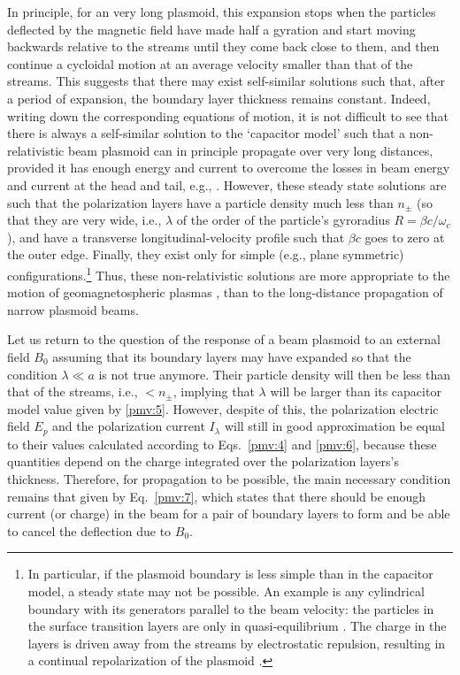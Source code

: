 \documentclass [12pt,a4paper,     ]{report} %
\begin{document}
  In principle, for an very long plasmoid, this expansion stops when the particles deflected by the magnetic field have made half a gyration and start moving backwards relative to the streams until they come back close to them, and then continue a cycloidal motion at an average velocity smaller than that of the streams.  This suggests that there may exist self-similar solutions such that, after a period of expansion, the boundary layer thickness remains constant.  Indeed, writing down the corresponding equations of motion, it is not difficult to see that there is always a self-similar solution to the `capacitor model' such that a non-relativistic beam plasmoid can in principle propagate over very long distances, provided it has enough energy and current to overcome the losses in beam energy and current at the head and tail, e.g., \cite{BOROV1987-}.  However, these steady state solutions are such that the polarization layers have a particle density much less than $n_\pm$ (so that they are very wide, i.e., $\lambda$ of the order of the particle's gyroradius $R=\beta c /\omega_c$), and have a transverse longitudinal-velocity profile such that $\beta c$ goes to zero at the outer edge. Finally, they exist only for simple (e.g., plane symmetric) configurations.\footnote{In particular, if the plasmoid boundary is less simple than in the capacitor model, a steady state may not be possible.  An example is any cylindrical boundary with its generators parallel to the beam velocity: the particles in the surface transition layers are only in quasi-equilibrium \cite{CHAPM1960-}. The charge in the layers is driven away from the streams by electrostatic repulsion, resulting in a continual repolarization of the plasmoid \cite{GALVE1991-}.} Thus, these non-relativistic solutions are more appropriate to the motion of geomagnetospheric plasmas \cite{CHAPM1960-}, than to the long-distance propagation of narrow plasmoid beams. 

   Let us return to the question of the response of a beam plasmoid to an external field $B_0$ assuming that its boundary layers may have expanded so that the condition $\lambda \ll a$ is not true anymore.  Their particle density will then be less than that of the streams, i.e., $< n_\pm$, implying that $\lambda$ will be larger than its  capacitor model value given by \eqref{pmv:5}.  However, despite of this, the polarization electric field $E_p$ and the polarization current $I_\lambda$ will still in good approximation be equal to their values calculated according to Eqs.~\eqref{pmv:4} and \eqref{pmv:6}, because these quantities depend on the charge integrated over the polarization layers's thickness. Therefore, for propagation to be possible, the main necessary condition remains that given by Eq.~\eqref{pmv:7}, which states that there should be enough current (or charge) in the beam for a pair of boundary layers to form and be able to cancel the deflection due to $B_0$.
\end{document}
